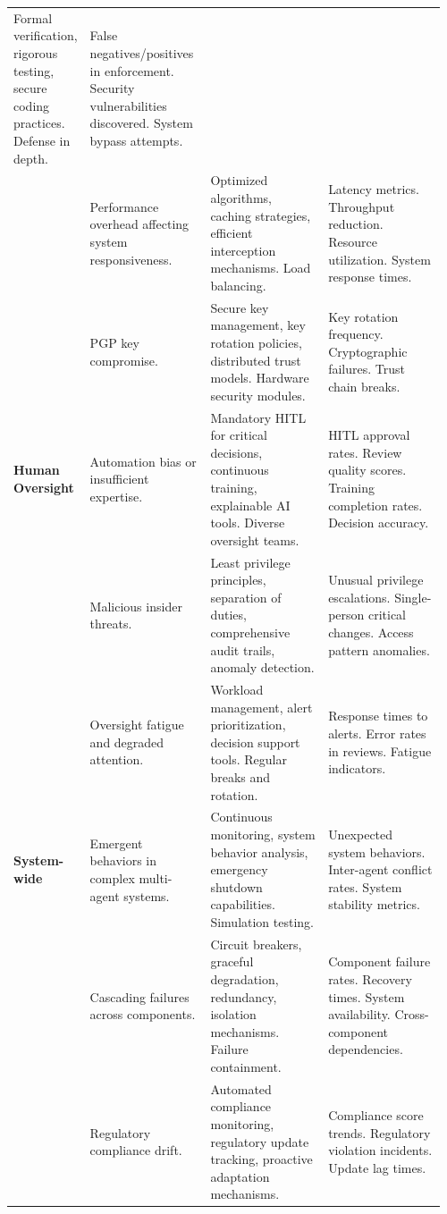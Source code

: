 \documentclass[sigconf,review,anonymous=false]{acmart} %
\begin{document}
\begin{table}[!ht]
{\begin{tabular}{@{}p{0.11\linewidth}p{0.28\linewidth}p{0.28\linewidth}p{0.29\linewidth}@{}}
    Formal verification, rigorous testing, secure coding practices. Defense in depth. &
    False negatives/positives in enforcement. Security vulnerabilities discovered. System bypass attempts. \\
    \addlinespace
    & Performance overhead affecting system responsiveness. &
    Optimized algorithms, caching strategies, efficient interception mechanisms. Load balancing. &
    Latency metrics. Throughput reduction. Resource utilization. System response times. \\
    \addlinespace
    & PGP key compromise. &
    Secure key management, key rotation policies, distributed trust models. Hardware security modules. &
    Key rotation frequency. Cryptographic failures. Trust chain breaks. \\
    \midrule
    \textbf{Human Oversight} &
    Automation bias or insufficient expertise. &
    Mandatory HITL for critical decisions, continuous training, explainable AI tools. Diverse oversight teams. &
    HITL approval rates. Review quality scores. Training completion rates. Decision accuracy. \\
    \addlinespace
    & Malicious insider threats. &
    Least privilege principles, separation of duties, comprehensive audit trails, anomaly detection. &
    Unusual privilege escalations. Single-person critical changes. Access pattern anomalies. \\
    \addlinespace
    & Oversight fatigue and degraded attention. &
    Workload management, alert prioritization, decision support tools. Regular breaks and rotation. &
    Response times to alerts. Error rates in reviews. Fatigue indicators. \\
    \midrule
    \textbf{System-wide} &
    Emergent behaviors in complex multi-agent systems. &
    Continuous monitoring, system behavior analysis, emergency shutdown capabilities. Simulation testing. &
    Unexpected system behaviors. Inter-agent conflict rates. System stability metrics. \\
    \addlinespace
    & Cascading failures across components. &
    Circuit breakers, graceful degradation, redundancy, isolation mechanisms. Failure containment. &
    Component failure rates. Recovery times. System availability. Cross-component dependencies. \\
    \addlinespace
    & Regulatory compliance drift. &
    Automated compliance monitoring, regulatory update tracking, proactive adaptation mechanisms. &
    Compliance score trends. Regulatory violation incidents. Update lag times. \\
    \bottomrule
  \end{tabular}
  }
\end{table}
\end{document}
